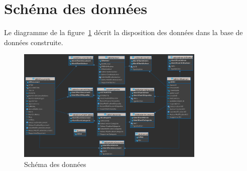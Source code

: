 	\section{Sch\'ema des donn\'ees}
		Le diagramme de la figure~\ref{SchemaDeDonnees} d\'ecrit la disposition des donn\'ees dans la base de donn\'ees construite.


			\begin{figure}[]
				\includegraphics[width=0.8\textwidth]{Pictures/DiagrammeDeDonnees.png}
				\centering
				\caption{Sch\'ema des donn\'ees}
				\label{SchemaDeDonnees}
			\end{figure}